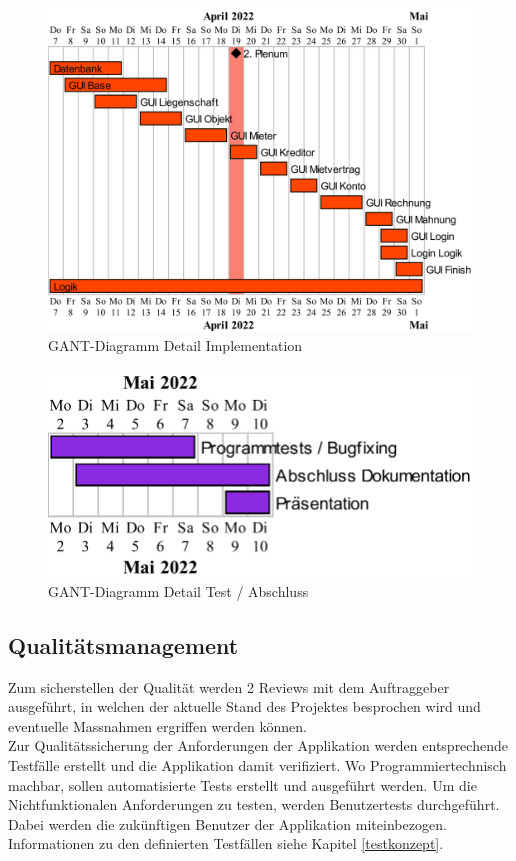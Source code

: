 \begin{figure}[H]
  \begin{center}
      \includegraphics[width=0.55\linewidth]{content/diagrams/out/planning/Implementation/Implementation.png}
      \caption{GANT-Diagramm Detail Implementation}
    \end{center}
\end{figure}

\begin{figure}[H]
  \begin{center}
      \includegraphics[width=0.45\linewidth]{content/diagrams/out/planning/Test/Test.png}
      \caption{GANT-Diagramm Detail Test / Abschluss}
    \end{center}
\end{figure}


\subsection{Qualitätsmanagement}
Zum sicherstellen der Qualität werden 2 Reviews mit dem Auftraggeber ausgeführt, in welchen der aktuelle Stand des Projektes besprochen wird und eventuelle Massnahmen ergriffen werden können. \\
Zur Qualitätssicherung der Anforderungen der Applikation werden entsprechende Testfälle erstellt und die Applikation damit verifiziert. Wo Programmiertechnisch machbar, sollen automatisierte Tests erstellt und ausgeführt werden. Um die Nichtfunktionalen Anforderungen zu testen, werden Benutzertests durchgeführt. Dabei werden die zukünftigen Benutzer der Applikation miteinbezogen. Informationen zu den definierten Testfällen siehe Kapitel \ref{testkonzept}.


